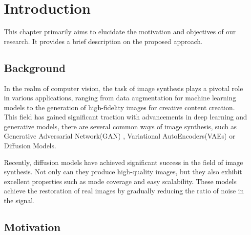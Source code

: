 \chapter{Introduction}
\label{chapter:intro}
This chapter primarily aims to elucidate the motivation and objectives of our research. It provides a brief description on the proposed approach.

\section{Background}
In the realm of computer vision, the task of image synthesis plays a pivotal role in various applications, ranging from data augmentation for machine learning models to the generation of high-fidelity images for creative content creation. This field has gained significant traction with advancements in deep learning and generative models, there are several common ways of image synthesis, such as Generative Adversarial Network(GAN) \cite{goodfellow2020generative}, Variational AutoEncoders(VAEs) \cite{kingma2013auto} or Diffusion Models.

Recently, diffusion models have achieved significant success in the field of image synthesis. Not only can they produce high-quality images, but they also exhibit excellent properties such as mode coverage and easy scalability. These models achieve the restoration of real images by gradually reducing the ratio of noise in the signal.


\section{Motivation}
